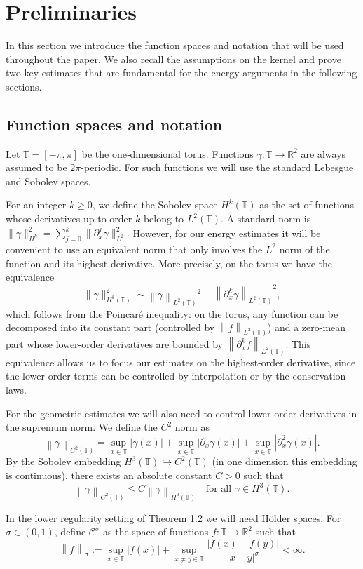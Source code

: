\documentclass[a4paper]{amsart}
\theoremstyle{definition}
\newcommand{\T}{\ensuremath{\mathbb{T}}}
\newcommand{\Lipa}[1][\gamma]{\ensuremath{\mathcal{C}^#1}}
\newcommand{\Na}[2][\gamma]{\ensuremath{\left\|#2\right\|_{#1}}}
\newcommand{\Lp}[2][2]{\ensuremath{\left\|#2\right\|_{L^#1(\T)}}}
\newcommand{\Ck}[2][2]{\ensuremath{\left\|#2\right\|_{C^#1(\T)}}}
\newcommand{\Hs}[1]{\ensuremath{\left\|#1\right\|_{H^3(\T)}}}
\begin{document}
\section{Preliminaries}  \label{sec:preliminariesUnified}
In this section we introduce the function spaces and notation that will be used throughout the paper. We also recall the assumptions on the kernel and prove two key estimates that are fundamental for the energy arguments in the following sections.

\subsection{Function spaces and notation}
Let \(\mathbb{T}=[-\pi,\pi]\) be the one‑dimensional torus. Functions \(\gamma:\mathbb{T}\to\mathbb{R}^2\) are always assumed to be \(2\pi\)-periodic. For such functions we will use the standard Lebesgue and Sobolev spaces.

For an integer \(k\ge 0\), we define the Sobolev space \(H^k(\mathbb{T})\) as the set of functions whose derivatives up to order \(k\) belong to \(L^2(\mathbb{T})\). A standard norm is
$
\|\gamma\|_{H^k}^2 = \sum_{j=0}^k \|\partial_x^j\gamma\|_{L^2}^2.
$ However, for our energy estimates it will be convenient to use an equivalent norm that only involves the \(L^2\) norm of the function and its highest derivative. More precisely, on the torus we have the equivalence
\[
\|\gamma\|_{H^k(\T)}^2 \sim \Lp{\gamma}^2 + \Lp{\partial_x^k\gamma}^2,
\]
which follows from the Poincaré inequality: on the torus, any function can be decomposed into its constant part (controlled by \Lp{f}) and a zero-mean part whose lower-order derivatives are bounded by \Lp{\partial_x^k f}. This equivalence allows us to focus our estimates on the highest-order derivative, since the lower-order terms can be controlled by interpolation or by the conservation laws.


For the geometric estimates we will also need to control lower-order derivatives in the supremum norm. We define the \(C^2\) norm as
\[
\Ck[2]{\gamma} = \sup_{x\in\mathbb{T}}|\gamma(x)| + \sup_{x\in\mathbb{T}}|\partial_x\gamma(x)| + \sup_{x\in\mathbb{T}}|\partial_x^2\gamma(x)|.
\]
By the Sobolev embedding \(H^3(\mathbb{T})\hookrightarrow C^2(\mathbb{T})\) (in one dimension this embedding is continuous), there exists an absolute constant \(C>0\) such that
\[
\Ck[2]{\gamma} \le C \Hs{\gamma} \quad \text{for all } \gamma\in H^3(\mathbb{T}).
\]

In the lower regularity setting of Theorem 1.2 we will need Hölder spaces. For \(\sigma\in(0,1)\), define \(\Lipa[\sigma]\) as the space of functions \(f:\mathbb{T}\to\mathbb{R}^2\) such that
\[
\Na[\sigma]{f} := \sup_{x\in\mathbb{T}}|f(x)| + \sup_{x\neq y\in\mathbb{T}}\frac{|f(x)-f(y)|}{|x-y|^\sigma} < \infty.
\]
\end{document}
